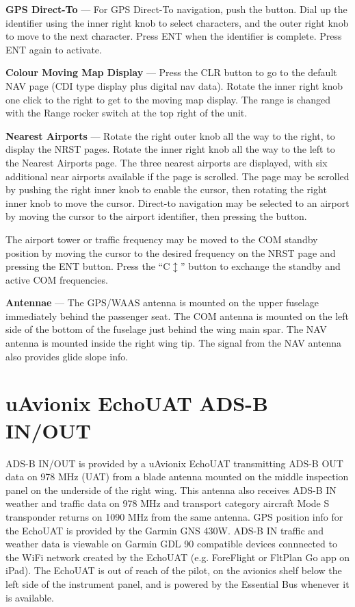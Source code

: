 \textbf{GPS Direct-To} --- For GPS Direct-To navigation, push the \directto button. Dial up the identifier using the inner right knob to select characters, and the outer right knob to move to the next character. Press ENT when the identifier is complete. Press ENT again to activate.

\textbf{Colour Moving Map Display} --- Press the CLR button to go to the default NAV page (CDI type display plus digital nav data). Rotate the inner right knob one click to the right to get to the moving map display. The range is changed with the Range rocker switch at the top right of the unit.

\textbf{Nearest Airports} --- Rotate the right outer knob all the way to the right, to display the NRST pages. Rotate the inner right knob all the way to the left to the Nearest Airports page. The three nearest airports are displayed, with six additional near airports available if the page is scrolled. The page may be scrolled by pushing the right inner knob to enable the cursor, then rotating the right inner knob to move the cursor. Direct-to navigation may be selected to an airport by moving the cursor to the airport identifier, then pressing the \directto button.

The airport tower or traffic frequency may be moved to the COM standby position by moving the cursor to the desired frequency on the NRST page and pressing the ENT button. Press the ``C$\updownarrow$'' button to exchange the standby and active COM frequencies.

\textbf{Antennae} --- The GPS/WAAS antenna is mounted on the upper fuselage immediately behind the passenger seat. The COM antenna is mounted on the left side of the bottom of the fuselage just behind the wing main spar. The NAV antenna is mounted inside the right wing tip. The signal from the NAV antenna also provides glide slope info.

\section{uAvionix EchoUAT ADS-B IN/OUT}
ADS-B IN/OUT is provided by a uAvionix EchoUAT transmitting ADS-B OUT data on 978 MHz (UAT) from a blade antenna mounted on the middle inspection panel on the underside of the right wing.  This antenna also receives ADS-B IN weather and traffic data on 978 MHz and transport category aircraft Mode S transponder returns on 1090 MHz from the same antenna. GPS position info for the EchoUAT is provided by the Garmin GNS 430W. ADS-B IN traffic and weather data is viewable on Garmin GDL 90 compatible devices connnected to the WiFi network created by the EchoUAT (e.g. ForeFlight or FltPlan Go app on iPad).  The EchoUAT is out of reach of the pilot, on the avionics shelf below the left side of the instrument panel, and is powered by the Essential Bus whenever it is available.

